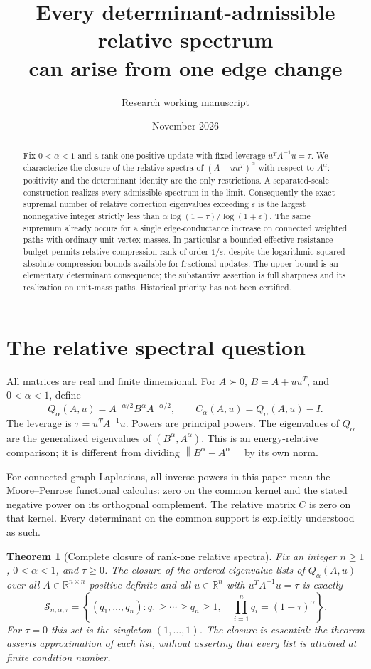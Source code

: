 \documentclass[11pt]{article}
\title{Every determinant-admissible relative spectrum\protect\\
can arise from one edge change}
\author{Research working manuscript}
\date{November 2026}
\newtheorem{theorem}{Theorem}[section]
\newcommand{\R}{\mathbb R}
\newcommand{\norm}[1]{\left\lVert#1\right\rVert}
\begin{document}
\maketitle
\begin{abstract}
Fix $0<\alpha<1$ and a rank-one positive update with fixed leverage
$u^TA^{-1}u=\tau$. We characterize the closure of the relative spectra
of $(A+uu^T)^\alpha$ with respect to $A^\alpha$: positivity and the
determinant identity are the only restrictions. A separated-scale
construction realizes every admissible spectrum in the limit.
Consequently the exact supremal number of relative correction
eigenvalues exceeding $\varepsilon$ is the largest nonnegative integer
strictly less than $\alpha\log(1+\tau)/\log(1+\varepsilon)$.
The same supremum already occurs for a single edge-conductance increase
on connected weighted paths with ordinary unit vertex masses. In
particular a bounded effective-resistance budget permits relative
compression rank of order $1/\varepsilon$, despite the logarithmic-squared
absolute compression bounds available for fractional updates. The upper
bound is an elementary determinant consequence; the substantive assertion
is full sharpness and its realization on unit-mass paths. Historical
priority has not been certified.
\end{abstract}

\section{The relative spectral question}
All matrices are real and finite dimensional. For $A\succ0$,
$B=A+uu^T$, and $0<\alpha<1$, define
\[
 Q_\alpha(A,u)=A^{-\alpha/2}B^\alpha A^{-\alpha/2},\qquad
 C_\alpha(A,u)=Q_\alpha(A,u)-I.
\]
The leverage is $\tau=u^TA^{-1}u$. Powers are principal powers.
The eigenvalues of $Q_\alpha$ are the generalized eigenvalues of
$(B^\alpha,A^\alpha)$. This is an energy-relative comparison; it is
different from dividing $\norm{B^\alpha-A^\alpha}$ by its own norm.

For connected graph Laplacians, all inverse powers in this paper mean
the Moore--Penrose functional calculus: zero on the common kernel and
the stated negative power on its orthogonal complement. The relative
matrix $C$ is zero on that kernel. Every determinant on the common
support is explicitly understood as such.

\begin{theorem}[Complete closure of rank-one relative spectra]
\label{thm:closure}
Fix an integer $n\ge1$, $0<\alpha<1$, and $\tau\ge0$.
The closure of the ordered eigenvalue lists of
$Q_\alpha(A,u)$ over all $A\in\R^{n\times n}$ positive definite and
all $u\in\R^n$ with $u^TA^{-1}u=\tau$ is exactly
\[
 \mathcal S_{n,\alpha,\tau}
 =\left\{(q_1,\ldots,q_n):
       q_1\ge\cdots\ge q_n\ge1,\quad
       \prod_{i=1}^nq_i=(1+\tau)^\alpha\right\}.
\]
For $\tau=0$ this set is the singleton $(1,\ldots,1)$.
The closure is essential: the theorem asserts approximation of each
list, without asserting that every list is attained at finite condition
number.
\end{theorem}
\end{document}
